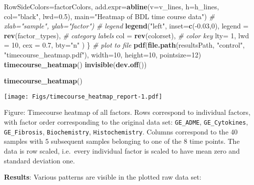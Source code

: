 \documentclass[]{article}
\newenvironment{Shaded}{\begin{snugshade}}{\end{snugshade}}
\newcommand{\KeywordTok}[1]{\textcolor[rgb]{0.13,0.29,0.53}{\textbf{{#1}}}}
\newcommand{\DataTypeTok}[1]{\textcolor[rgb]{0.13,0.29,0.53}{{#1}}}
\newcommand{\DecValTok}[1]{\textcolor[rgb]{0.00,0.00,0.81}{{#1}}}
\newcommand{\FloatTok}[1]{\textcolor[rgb]{0.00,0.00,0.81}{{#1}}}
\newcommand{\StringTok}[1]{\textcolor[rgb]{0.31,0.60,0.02}{{#1}}}
\newcommand{\CommentTok}[1]{\textcolor[rgb]{0.56,0.35,0.01}{\textit{{#1}}}}
\newcommand{\NormalTok}[1]{{#1}}
\begin{document}
\begin{Shaded}
\begin{Highlighting}[]
            \DataTypeTok{RowSideColors=}\NormalTok{factorColors,}
            \DataTypeTok{add.expr=}\KeywordTok{abline}\NormalTok{(}\DataTypeTok{v=}\NormalTok{v_lines, }\DataTypeTok{h=}\NormalTok{h_lines, }\DataTypeTok{col=}\StringTok{"black"}\NormalTok{, }\DataTypeTok{lwd=}\FloatTok{0.5}\NormalTok{),}
            \DataTypeTok{main=}\StringTok{"Heatmap of BDL time course data"}\NormalTok{)}
            \CommentTok{# xlab="sample", ylab="factor")}
  \CommentTok{# legend}
  \KeywordTok{legend}\NormalTok{(}\StringTok{"left"}\NormalTok{,}
      \DataTypeTok{inset=}\KeywordTok{c}\NormalTok{(-}\FloatTok{0.03}\NormalTok{,}\DecValTok{0}\NormalTok{),}
      \DataTypeTok{legend =} \KeywordTok{rev}\NormalTok{(factor_types), }\CommentTok{# category labels}
      \DataTypeTok{col =} \KeywordTok{rev}\NormalTok{(colorset),  }\CommentTok{# color key}
      \DataTypeTok{lty=} \DecValTok{1}\NormalTok{, }\DataTypeTok{lwd =} \DecValTok{10}\NormalTok{, }\DataTypeTok{cex =} \FloatTok{0.7}\NormalTok{, }\DataTypeTok{bty=}\StringTok{"n"}
  \NormalTok{)}
\NormalTok{\}}
\CommentTok{# plot to file}
\KeywordTok{pdf}\NormalTok{(}\KeywordTok{file.path}\NormalTok{(resultsPath, }\StringTok{"control"}\NormalTok{, }\StringTok{"timecourse_heatmap.pdf"}\NormalTok{), }
    \DataTypeTok{width=}\DecValTok{10}\NormalTok{, }\DataTypeTok{height=}\DecValTok{10}\NormalTok{, }\DataTypeTok{pointsize=}\DecValTok{12}\NormalTok{) }
\KeywordTok{timecourse_heatmap}\NormalTok{()}
\KeywordTok{invisible}\NormalTok{(}\KeywordTok{dev.off}\NormalTok{())}
\end{Highlighting}
\end{Shaded}

\begin{Shaded}
\begin{Highlighting}[]
\KeywordTok{timecourse_heatmap}\NormalTok{()}
\end{Highlighting}
\end{Shaded}

\texttt{[image: Figs/timecourse\_heatmap\_report-1.pdf]}

Figure: Timecourse heatmap of all factors. Rows correspond to individual
factors, with factor order corresponding to the original data set:
\texttt{GE\_ADME}, \texttt{GE\_Cytokines}, \texttt{GE\_Fibrosis},
\texttt{Biochemistry}, \texttt{Histochemistry}. Columns correspond to
the 40 samples with 5 subsequent samples belonging to one of the 8 time
points. The data is row scaled, i.e.~every individual factor is scaled
to have mean zero and standard deviation one.

\textbf{Results}: Various patterns are visible in the plotted raw data
set:
\end{document}
